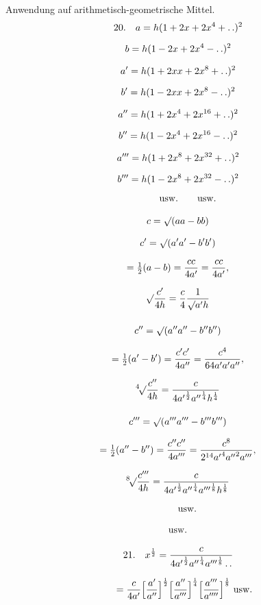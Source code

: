 \begingroup
\renewcommand{\arraystretch}{1.45}

Anwendung auf arithmetisch-geometrische Mittel.
\[
\begin{gathered}
20.\quad a=h(1+2x+2x^4+\mathinner{.\,.})^2\\[6pt]b=h(1-2x+2x^4-\mathinner{.\,.})^2\\[7pt]
a'=h(1+2xx+2x^8+\mathinner{.\,.})^2\\[6pt]b'=h(1-2xx+2x^8-\mathinner{.\,.})^2\\[7pt]
a''=h(1+2x^4+2x^{16}+\mathinner{.\,.})^2\\[6pt]b''=h(1-2x^4+2x^{16}-\mathinner{.\,.})^2\\[7pt]
a'''=h(1+2x^8+2x^{32}+\mathinner{.\,.})^2\\[6pt]b'''=h(1-2x^8+2x^{32}-\mathinner{.\,.})^2\\[5pt]
\qquad\mathrm{usw.}\qquad\mathrm{usw.}
\end{gathered}
\]

\[
\begin{gathered}
c=\surd(aa-bb)\\[8pt]
c'=\surd(a'a'-b'b')\\[7pt]=\tfrac12(a-b)=\dfrac{cc}{4a'}=\dfrac{cc}{4a'},
\\[7pt]\surd\dfrac{c'}{4h}=\dfrac{c}{4}\dfrac{1}{\surd a'h}\\[12pt]
c''=\surd(a''a''-b''b'')\\[7pt]=\tfrac12(a'-b')=\dfrac{c'c'}{4a''}=\dfrac{c^4}{64a'a'a''},
\\[7pt]{}^{4}\!\surd\dfrac{c''}{4h}=\dfrac{c}{4{a'}^{\frac12}{a''}^{\frac14}h^{\frac14}}\\[12pt]
c'''=\surd(a'''a'''-b'''b''')\\[7pt]=\tfrac12(a''-b'')=\dfrac{c''c''}{4a'''}=\dfrac{c^8}{2^{14}{a'}^4{a''}^2a'''},
\\[7pt]{}^{8}\!\surd\dfrac{c'''}{4h}=\dfrac{c}{4{a'}^{\frac12}{a''}^{\frac14}{a'''}^{\frac18}h^{\frac18}}\\[7pt]
\qquad\mathrm{usw.}\\[7pt]\mathrm{usw.}
\end{gathered}
\]

\[
\begin{gathered}21.\quad x^{\frac12}=\frac{c}{4{a'}^{\frac12}{a''}^{\frac14}{a'''}^{\frac18}\mathinner{.\,.}}
\\[8pt]\quad{}=\frac{c}{4a'}\Bigl[\frac{a'}{a''}\Bigr]^{\frac12}
\Bigl[\frac{a''}{a'''}\Bigr]^{\frac14}
\Bigl[\frac{a'''}{a''''}\Bigr]^{\frac18}\ \mathrm{usw.}\end{gathered}
\]

